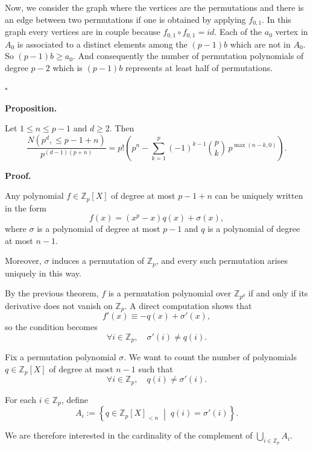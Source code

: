 \documentclass{article}
\begin{document}
Now, we consider the graph where the vertices are the permutations and there is an edge between two permutations if one is obtained by applying $f_{0,1}$. In this graph every vertices are in couple because $f_{0,1} \circ f_{0,1} = id$. Each of the $a_0$ vertex in $A_0$ is associated to a distinct elements among the $(p-1)b$ which are not in $A_0$. So $(p-1)b \geq a_0$. And consequently the number of permutation polynomials of degree $p-2$ which is $(p-1)b$ represents at least half of permutations.

\vspace{0.3cm}

\hfill $\square$

\textbf{Proposition.}

Let $1 \leq n \leq p-1$ and $d \geq 2$. Then
\[
\frac{N(p^d,\leq p-1+n)}{p^{(d-1)(p+n)}}
= p! \left( 
p^n - \sum_{k=1}^{p} (-1)^{k-1} \binom{p}{k} \, p^{\max(n-k,0)}
\right).
\]

\vspace{0.3cm}

\textbf{Proof.}

Any polynomial $f \in \mathbb{Z}_{p}[X]$ of degree at most $p-1+n$ can be uniquely written in the form
\[
f(x) = (x^p - x) q(x) + \sigma(x),
\]
where $\sigma$ is a polynomial of degree at most $p-1$ and $q$ is a polynomial of degree at most $n-1$.

Moreover, $\sigma$ induces a permutation of $\mathbb{Z}_p$, and every such permutation arises uniquely in this way.

\vspace{0.2cm}

By the previous theorem, $f$ is a permutation polynomial over $\mathbb{Z}_{p^d}$ if and only if its derivative does not vanish on $\mathbb{Z}_p$. A direct computation shows that
\[
f'(x) \equiv -q(x) + \sigma'(x) ,
\]
so the condition becomes
\[
\forall i \in \mathbb{Z}_p, \quad \sigma'(i) \neq q(i).
\]

\vspace{0.2cm}

Fix a permutation polynomial $\sigma$. We want to count the number of polynomials $q \in \mathbb{Z}_p[X]$ of degree at most $n-1$ such that
\[
\forall i \in \mathbb{Z}_p, \quad q(i) \neq \sigma'(i).
\]

For each $i \in \mathbb{Z}_p$, define
\[
A_i := \left\{ q \in \mathbb{Z}_p[X]_{< n} \;\middle|\; q(i) = \sigma'(i) \right\}.
\]

We are therefore interested in the cardinality of the complement of $\bigcup_{i \in \mathbb{Z}_p} A_i$.
\end{document}
